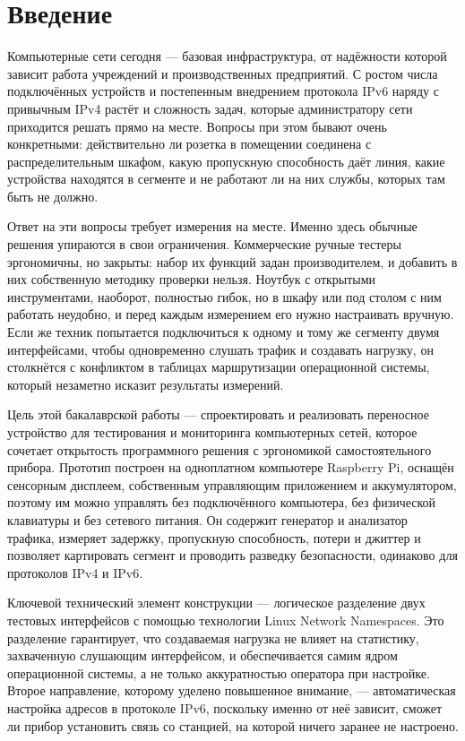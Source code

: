 \chapter{Введение}
\label{sec:introduction}

Компьютерные сети сегодня — базовая инфраструктура, от надёжности которой зависит работа учреждений и производственных предприятий. С ростом числа подключённых устройств и постепенным внедрением протокола IPv6 наряду с привычным IPv4 растёт и сложность задач, которые администратору сети приходится решать прямо на месте. Вопросы при этом бывают очень конкретными: действительно ли розетка в помещении соединена с распределительным шкафом, какую пропускную способность даёт линия, какие устройства находятся в сегменте и не работают ли на них службы, которых там быть не должно.

Ответ на эти вопросы требует измерения на месте. Именно здесь обычные решения упираются в свои ограничения. Коммерческие ручные тестеры эргономичны, но закрыты: набор их функций задан производителем, и добавить в них собственную методику проверки нельзя. Ноутбук с открытыми инструментами, наоборот, полностью гибок, но в шкафу или под столом с ним работать неудобно, и перед каждым измерением его нужно настраивать вручную. Если же техник попытается подключиться к одному и тому же сегменту двумя интерфейсами, чтобы одновременно слушать трафик и создавать нагрузку, он столкнётся с конфликтом в таблицах маршрутизации операционной системы, который незаметно исказит результаты измерений.

Цель этой бакалаврской работы — спроектировать и реализовать переносное устройство для тестирования и мониторинга компьютерных сетей, которое сочетает открытость программного решения с эргономикой самостоятельного прибора. Прототип построен на одноплатном компьютере Raspberry Pi, оснащён сенсорным дисплеем, собственным управляющим приложением и аккумулятором, поэтому им можно управлять без подключённого компьютера, без физической клавиатуры и без сетевого питания. Он содержит генератор и анализатор трафика, измеряет задержку, пропускную способность, потери и джиттер и позволяет картировать сегмент и проводить разведку безопасности, одинаково для протоколов IPv4 и IPv6.

Ключевой технический элемент конструкции — логическое разделение двух тестовых интерфейсов с помощью технологии Linux Network Namespaces. Это разделение гарантирует, что создаваемая нагрузка не влияет на статистику, захваченную слушающим интерфейсом, и обеспечивается самим ядром операционной системы, а не только аккуратностью оператора при настройке. Второе направление, которому уделено повышенное внимание, — автоматическая настройка адресов в протоколе IPv6, поскольку именно от неё зависит, сможет ли прибор установить связь со станцией, на которой ничего заранее не настроено.

